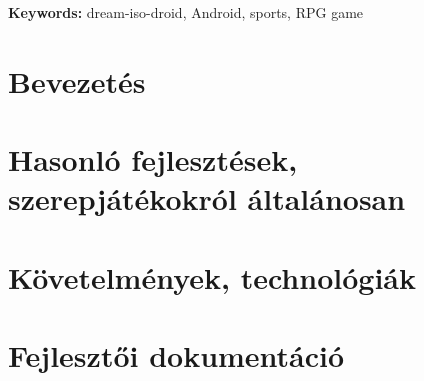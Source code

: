 \documentclass[a4paper,oneside,10pt]{report}
\begin{document}
\textbf{Keywords:} dream-iso-droid, Android, sports, RPG game
\tableofcontents
\newpage
\listoffigures
\newpage






\pagestyle{plain} %

\chapter{Bevezetés}
\label{bev}


\chapter{Hasonló fejlesztések, szerepjátékokról általánosan}
\label{bem}


\chapter{Követelmények, technológiák}
\label{kovetelmeny}


\chapter{Fejlesztői dokumentáció}
\label{devmanual}




\end{document}
